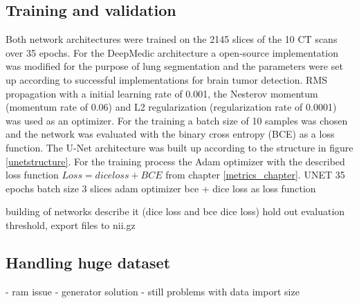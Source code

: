 \subsection{Training and validation}
Both network architectures were trained on the 2145 slices of the 10 CT scans over 35 epochs.\newline
For the DeepMedic architecture a open-source implementation was modified for the purpose of lung segmentation and the parameters were set up according to successful implementations for brain tumor detection. RMS propagation with a initial learning rate of 0.001, the Nesterov momentum (momentum rate of 0.06) and L2 regularization (regularization rate of 0.0001) was used as an optimizer. For the training a batch size of 10 samples was chosen and the network was evaluated with the binary cross entropy (BCE) as a loss function.\newline
The U-Net architecture was built up according to the structure in figure \ref{unetstructure}. For the training process the Adam optimizer with the described loss function $Loss = dice loss + BCE$ from chapter \ref{metrics_chapter}.\newline
UNET
35 epochs
batch size 3 slices
adam optimizer
bce + dice loss as loss function

building of networks
describe it (dice loss and bce dice loss)
hold out evaluation
threshold, export files to nii.gz

\subsection{Handling huge dataset}
- ram issue
- generator solution
- still problems with data import size